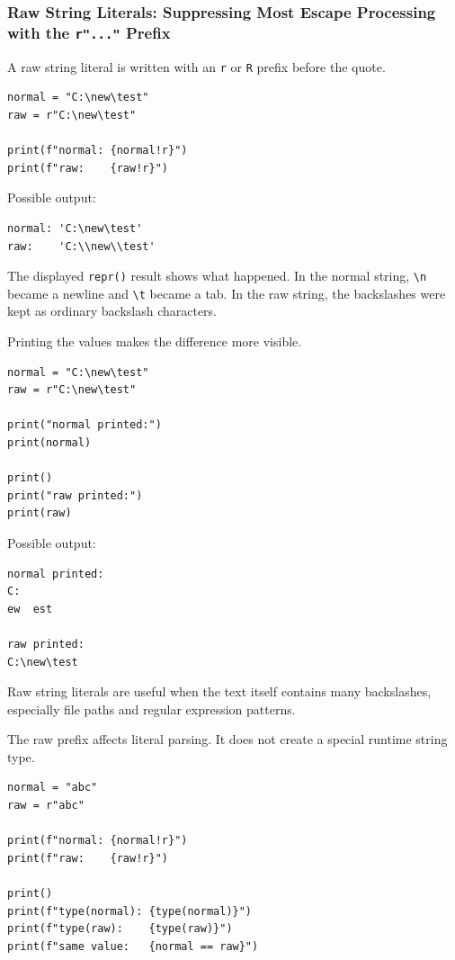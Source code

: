 \subsubsection{Raw String Literals: Suppressing Most Escape Processing with the \texttt{r"..."} Prefix}

A raw string literal is written with an \texttt{r} or \texttt{R} prefix before the quote.

\begin{verbatim}
normal = "C:\new\test"
raw = r"C:\new\test"

print(f"normal: {normal!r}")
print(f"raw:    {raw!r}")
\end{verbatim}

Possible output:

\begin{verbatim}
normal: 'C:\new\test'
raw:    'C:\\new\\test'
\end{verbatim}

The displayed \texttt{repr()} result shows what happened. In the normal string, \texttt{\textbackslash n} became a newline and \texttt{\textbackslash t} became a tab. In the raw string, the backslashes were kept as ordinary backslash characters.

Printing the values makes the difference more visible.

\begin{verbatim}
normal = "C:\new\test"
raw = r"C:\new\test"

print("normal printed:")
print(normal)

print()
print("raw printed:")
print(raw)
\end{verbatim}

Possible output:

\begin{verbatim}
normal printed:
C:
ew	est

raw printed:
C:\new\test
\end{verbatim}

Raw string literals are useful when the text itself contains many backslashes, especially file paths and regular expression patterns.

The raw prefix affects literal parsing. It does not create a special runtime string type.

\begin{verbatim}
normal = "abc"
raw = r"abc"

print(f"normal: {normal!r}")
print(f"raw:    {raw!r}")

print()
print(f"type(normal): {type(normal)}")
print(f"type(raw):    {type(raw)}")
print(f"same value:   {normal == raw}")
\end{verbatim}

